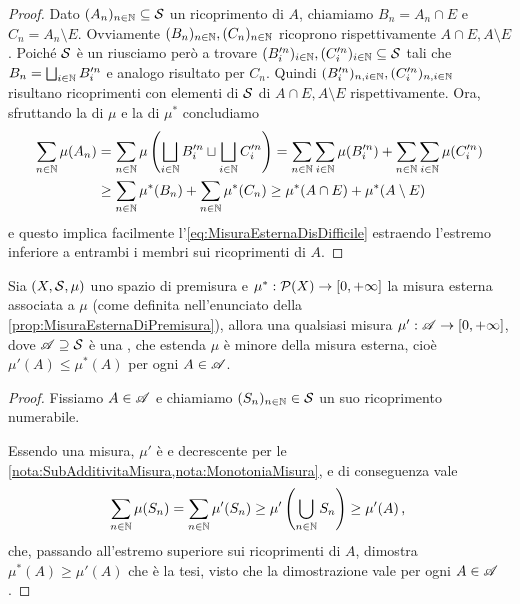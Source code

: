 \begin{proof}
	Dato $(A_n)_{n\in\N}\subseteq\S$ un ricoprimento di $A$, chiamiamo $B_n=A_n\cap E$ e $C_n=A_n\setminus E$. Ovviamente $(B_n)_{n\in\N},(C_n)_{n\in\N}$ ricoprono rispettivamente $A\cap E,A\setminus E$. Poiché $\S$ è un \semiring{} riusciamo però a trovare $(B'^n_i)_{i\in\N},(C'^n_i)_{i\in\N} \subseteq \S$ tali che $B_n=\bigsqcup_{i\in\N}B'^n_i$ e analogo risultato per $C_n$. Quindi $(B'^n_i)_{n,i\in\N}, (C'^n_i)_{n,i\in\N}$ risultano ricoprimenti con elementi di $\S$ di $A\cap E,A\setminus E$ rispettivamente.
	Ora, sfruttando la \sigadd[ità] di $\mu$ e la \sigsubadd[ità] di $\mu^*$ concludiamo
	\begin{align*}
		\sum_{n\in\N}\mu(A_n)&=
		\sum_{n\in\N} \mu\left(\bigsqcup_{i\in\N} B'^n_i\sqcup \bigsqcup_{i\in\N} C'^n_i\right)=
		\sum_{n\in\N}\sum_{i\in\N}\mu(B'^n_i)+\sum_{n\in\N}\sum_{i\in\N}\mu(C'^n_i)\\
		&\ge
		\sum_{n\in\N}\mu^*(B_n)+\sum_{n\in\N}\mu^*(C_n)
		\ge \mu^*(A\cap E)+\mu^*(A\setminus E)
	\end{align*}
	e questo implica facilmente l'\cref{eq:MisuraEsternaDisDifficile} estraendo l'estremo inferiore a entrambi i membri sui ricoprimenti di $A$.
\end{proof}
\begin{remark}\label{nota:PremisuraMassimaMisura}
	Sia $(X,\S,\mu)$ uno spazio di premisura e $\mu^*:\mathcal P(X)\to\Rpiu$ la misura esterna associata a $\mu$ (come definita nell'enunciato della \cref{prop:MisuraEsternaDiPremisura}), allora una qualsiasi misura $\mu':\A\to\Rpiu$, dove $\A\supseteq \S$ è una \sigalg{}, che estenda $\mu$ è minore della misura esterna, cioè $\mu'(A)\le \mu^*(A)$ per ogni $A\in\A$.
\end{remark}
\begin{proof}
	Fissiamo $A\in\A$ e chiamiamo $(S_n)_{n\in\N}\in\S$ un suo ricoprimento numerabile.
	
	Essendo una misura, $\mu'$ è \sigsubadd{} e decrescente per le \cref{nota:SubAdditivitaMisura,nota:MonotoniaMisura}, e di conseguenza vale
	\begin{equation*}
		\sum_{n\in\N}\mu(S_n)=\sum_{n\in\N}\mu'(S_n)\ge \mu'\left(\bigcup_{n\in\N}S_n\right)\ge \mu'(A) \virgola
	\end{equation*}
	che, passando all'estremo superiore sui ricoprimenti di $A$, dimostra $\mu^*(A)\ge\mu'(A)$ che è la tesi, visto che la dimostrazione vale per ogni $A\in\A$.
\end{proof}



